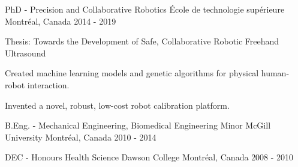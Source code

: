 \begin{cventries}

\cventry
{PhD - Precision and Collaborative Robotics}
{École de technologie supérieure}
{Montréal, Canada}
{2014 - 2019}
{
\begin{cvitems}
\item{Thesis: Towards the Development of Safe, Collaborative Robotic Freehand Ultrasound}
\item{Created machine learning models and genetic algorithms for physical human-robot interaction.}
\item{Invented a novel, robust, low-cost robot calibration platform.}
\end{cvitems}
}

\cventry
{B.Eng. - Mechanical Engineering, Biomedical Engineering Minor}
{McGill University}
{Montréal, Canada}
{2010 - 2014}
{
\begin{cvitems}
\end{cvitems}
}

\cventry
{DEC - Honours Health Science}
{Dawson College}
{Montréal, Canada}
{2008 - 2010}
{
\begin{cvitems}
\end{cvitems}
}

\end{cventries}
